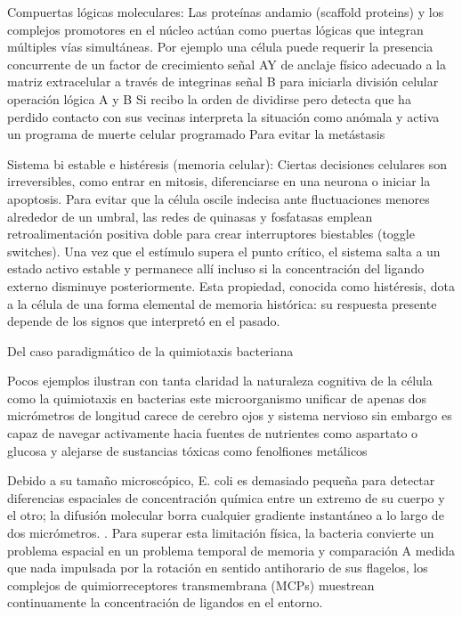Compuertas lógicas moleculares: Las proteínas andamio (scaffold proteins) y los complejos promotores en el núcleo actúan como puertas lógicas que integran múltiples vías simultáneas. 
Por ejemplo una célula puede requerir la presencia concurrente de un factor de crecimiento señal AY de anclaje físico adecuado a la matriz extracelular a través de integrinas señal B para iniciarla división celular operación lógica A y B
Si recibo la orden de dividirse pero detecta que ha perdido contacto con sus vecinas interpreta la situación como anómala y activa un programa de muerte celular programado Para evitar la metástasis 

Sistema bi estable e histéresis (memoria celular): Ciertas decisiones celulares son irreversibles, como entrar en mitosis, diferenciarse en una neurona o iniciar la apoptosis. 
Para evitar que la célula oscile indecisa ante fluctuaciones menores alrededor de un umbral, las redes de quinasas y fosfatasas emplean retroalimentación positiva doble para crear interruptores biestables (toggle switches). 
Una vez que el estímulo supera el punto crítico, el sistema salta a un estado activo estable y permanece allí incluso si la concentración del ligando externo disminuye posteriormente. 
Esta propiedad, conocida como histéresis, dota a la célula de una forma elemental de memoria histórica: su respuesta presente depende de los signos que interpretó en el pasado.

Del caso paradigmático de la quimiotaxis bacteriana

Pocos ejemplos ilustran con tanta claridad la naturaleza cognitiva de la célula como la quimiotaxis en bacterias este microorganismo unificar de apenas dos micrómetros de longitud carece de cerebro ojos y sistema nervioso sin embargo es capaz de navegar activamente hacia fuentes de nutrientes como aspartato o glucosa y alejarse de sustancias tóxicas como fenolfiones metálicos

Debido a su tamaño microscópico, E. coli es demasiado pequeña para detectar diferencias espaciales de concentración química entre un extremo de su cuerpo y el otro; la difusión molecular borra cualquier gradiente instantáneo a lo largo de dos micrómetros.
. Para superar esta limitación física, la bacteria convierte un problema espacial en un problema temporal de memoria y comparación
A medida que nada impulsada por la rotación en sentido antihorario de sus flagelos, los complejos de quimiorreceptores transmembrana (MCPs) muestrean continuamente la concentración de ligandos en el entorno.

